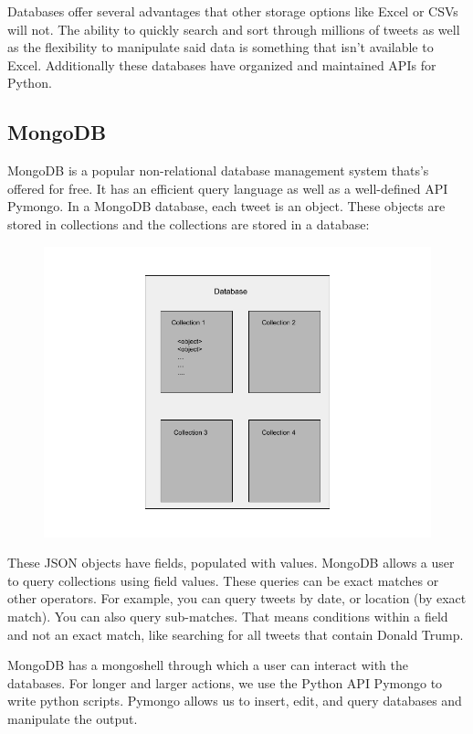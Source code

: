 \documentclass[11pt, twoside, reqno]{article}
\begin{document}
Databases offer several advantages that other storage options like Excel or CSVs will not. The ability to quickly search and sort through millions of tweets as well as the flexibility to manipulate said data is something that isn't available to Excel. Additionally these databases have organized and maintained APIs for Python. 

\subsection{MongoDB}
\hspace{0.1in} MongoDB is a popular non-relational database management system thats's offered for free. It has an efficient query language as well as a well-defined API Pymongo. In a MongoDB database, each tweet is an object. These objects are stored in collections and the collections are stored in a database:

\begin{figure}[h]
	\includegraphics[scale=0.5]{database}
\end{figure}

These JSON objects have fields, populated with values. MongoDB allows a user to query collections using field values. These queries can be exact matches or other operators. For example, you can query tweets by date, or location (by exact match). You can also query sub-matches. That means conditions within a field and not an exact match, like searching for all tweets that contain Donald Trump.

MongoDB has a mongoshell through which a user can interact with the databases. For longer and larger actions, we use the Python API Pymongo to write python scripts. Pymongo allows us to insert, edit, and query databases and manipulate the output. 
\end{document}
